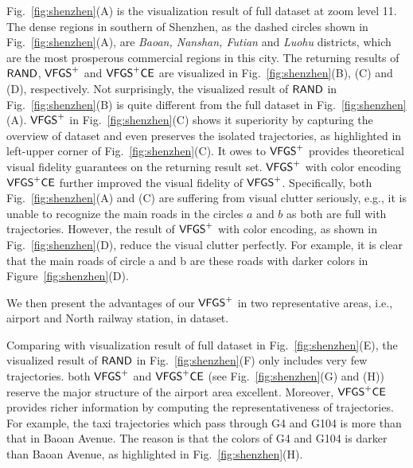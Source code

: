Fig.~\ref{fig:shenzhen}(A) is the visualization result of full \sz{} dataset at zoom level 11.
The dense regions in southern of Shenzhen, as the dashed circles shown in Fig.~\ref{fig:shenzhen}(A), are \emph{Baoan, Nanshan, Futian} and \emph{Luohu} districts,
which are the most prosperous commercial regions in this city.
The returning results of $\mathsf{RAND}$, $\mathsf{VFGS}^{+}$ and $\mathsf{VFGS}^{+}\mathsf{CE}$ are visualized in Fig.~\ref{fig:shenzhen}(B), (C) and (D), respectively.
Not surprisingly,  the visualized result of $\mathsf{RAND}$ in Fig.~\ref{fig:shenzhen}(B) is quite different from the full dataset in Fig.~\ref{fig:shenzhen}(A).
$\mathsf{VFGS}^{+}$ in Fig.~\ref{fig:shenzhen}(C) shows it superiority by capturing the overview of \sz{} dataset and even preserves the isolated trajectories,
as highlighted in left-upper corner of Fig.~\ref{fig:shenzhen}(C).
It owes to $\mathsf{VFGS}^{+}$ provides theoretical visual fidelity guarantees on the returning result set.
$\mathsf{VFGS}^{+}$ with color encoding $\mathsf{VFGS}^{+}\mathsf{CE}$ further improved the visual fidelity of $\mathsf{VFGS}^{+}$.
Specifically, both Fig.~\ref{fig:shenzhen}(A) and (C) are suffering from visual clutter seriously,
e.g., it is unable to recognize the main roads in the circles $a$ and $b$ as both are full with trajectories.
However, the result of $\mathsf{VFGS}^{+}$ with color encoding, as shown in Fig.~\ref{fig:shenzhen}(D), reduce the visual clutter perfectly.
For example, it is clear that the main roads of circle a and b are these roads with {darker} colors in Figure~\ref{fig:shenzhen}(D).

We then present the advantages of our $\mathsf{VFGS}^{+}$ in two representative areas, i.e., airport and North railway station, in \sz{} dataset.

Comparing with visualization result of full dataset in Fig.~\ref{fig:shenzhen}(E),
the visualized result of $\mathsf{RAND}$ in Fig.~\ref{fig:shenzhen}(F) only includes very few trajectories.
both $\mathsf{VFGS}^{+}$ and $\mathsf{VFGS}^{+}\mathsf{CE}$ (see Fig.~\ref{fig:shenzhen}(G) and (H)) reserve the major structure of the airport area excellent.
Moreover, $\mathsf{VFGS}^{+}\mathsf{CE}$ provides richer information by computing the representativeness of trajectories.
For example, the taxi trajectories which pass through G4 and G104 is more than that in Baoan Avenue.
The reason is that the colors of G4 and G104 is {darker} than Baoan Avenue, as highlighted in Fig.~\ref{fig:shenzhen}(H).


